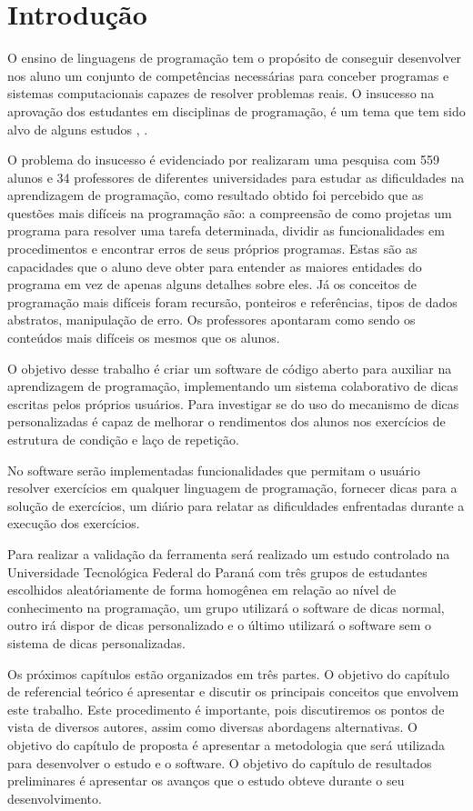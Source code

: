 \chapter{Introdução}

O ensino de linguagens de programação tem o propósito de conseguir desenvolver nos aluno um conjunto de competências necessárias para conceber programas e sistemas computacionais capazes de resolver problemas reais. O insucesso na aprovação dos estudantes em disciplinas de programação, é um tema que tem sido alvo de alguns estudos \cite{bosse2015reprovaccoes}, \cite{Cukierman:2015:PSU:2729094.2742623}.

O problema do insucesso é evidenciado por \cite{lahtinen2005study} realizaram uma pesquisa com 559 alunos e 34 professores de diferentes universidades para estudar as dificuldades na aprendizagem de programação, como resultado obtido foi percebido que as questões mais difíceis na programação são: a compreensão de como projetas um programa para resolver uma tarefa determinada, dividir as funcionalidades em procedimentos e encontrar erros de seus próprios programas. Estas são as capacidades que o aluno deve obter para entender as maiores entidades do programa em vez de apenas alguns detalhes sobre eles. Já os conceitos de programação mais difíceis foram recursão, ponteiros e referências, tipos de dados abstratos, manipulação de erro. Os professores apontaram como sendo os conteúdos mais difíceis os mesmos que os alunos.

O objetivo desse trabalho é criar um software de código aberto para auxiliar na aprendizagem de programação, implementando um sistema colaborativo de dicas escritas pelos próprios usuários. Para investigar se do uso do mecanismo de dicas personalizadas é capaz de melhorar o rendimentos dos alunos nos exercícios de estrutura de condição e laço de repetição.

No software serão implementadas funcionalidades que permitam o usuário resolver exercícios em qualquer linguagem de programação, fornecer dicas para a solução de exercícios, um diário para relatar as dificuldades enfrentadas durante a execução dos exercícios.

Para realizar a validação da ferramenta será realizado um estudo controlado na Universidade Tecnológica Federal do Paraná com três grupos de estudantes escolhidos aleatóriamente de forma homogênea em relação ao nível de conhecimento na programação, um grupo utilizará o software de dicas normal, outro irá dispor de dicas personalizado e o último utilizará o software sem o sistema de dicas personalizadas.

Os próximos capítulos estão organizados em três partes. O objetivo do capítulo de referencial teórico é apresentar e discutir os principais conceitos que envolvem este trabalho. Este  procedimento é importante, pois discutiremos os pontos de vista de diversos autores, assim como diversas abordagens alternativas. O objetivo do capítulo de proposta é apresentar a metodologia que será utilizada para desenvolver o estudo e o software. O objetivo do capítulo de resultados preliminares é apresentar os avanços que o estudo obteve durante o seu desenvolvimento.




